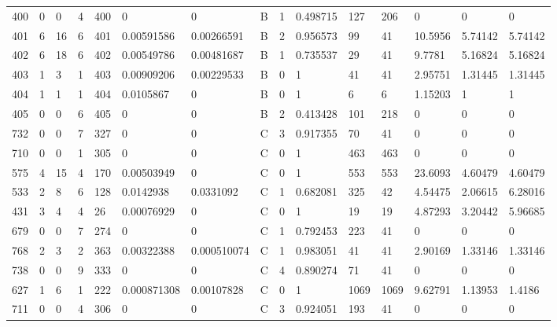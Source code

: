 \begin{latin}
\begin{longtable}{lllllllllllllll}
	400 & 0  & 0   & 4  & 400 & 0              & 0              & B & 1  & 0.498715 & 127  & 206  & 0       & 0       & 0       \\
	401 & 6  & 16  & 6  & 401 & 0.00591586     & 0.00266591     & B & 2  & 0.956573 & 99   & 41   & 10.5956 & 5.74142 & 5.74142 \\
	402 & 6  & 18  & 6  & 402 & 0.00549786     & 0.00481687     & B & 1  & 0.735537 & 29   & 41   & 9.7781  & 5.16824 & 5.16824 \\
	403 & 1  & 3   & 1  & 403 & 0.00909206     & 0.00229533     & B & 0  & 1        & 41   & 41   & 2.95751 & 1.31445 & 1.31445 \\
	404 & 1  & 1   & 1  & 404 & 0.0105867      & 0              & B & 0  & 1        & 6    & 6    & 1.15203 & 1       & 1       \\
	405 & 0  & 0   & 6  & 405 & 0              & 0              & B & 2  & 0.413428 & 101  & 218  & 0       & 0       & 0       \\
	732 & 0  & 0   & 7  & 327 & 0              & 0              & C & 3  & 0.917355 & 70   & 41   & 0       & 0       & 0       \\
	710 & 0  & 0   & 1  & 305 & 0              & 0              & C & 0  & 1        & 463  & 463  & 0       & 0       & 0       \\
	575 & 4  & 15  & 4  & 170 & 0.00503949     & 0              & C & 0  & 1        & 553  & 553  & 23.6093 & 4.60479 & 4.60479 \\
	533 & 2  & 8   & 6  & 128 & 0.0142938      & 0.0331092      & C & 1  & 0.682081 & 325  & 42   & 4.54475 & 2.06615 & 6.28016 \\
	431 & 3  & 4   & 4  & 26  & 0.00076929     & 0              & C & 0  & 1        & 19   & 19   & 4.87293 & 3.20442 & 5.96685 \\
	679 & 0  & 0   & 7  & 274 & 0              & 0              & C & 1  & 0.792453 & 223  & 41   & 0       & 0       & 0       \\
	768 & 2  & 3   & 2  & 363 & 0.00322388     & 0.000510074    & C & 1  & 0.983051 & 41   & 41   & 2.90169 & 1.33146 & 1.33146 \\
	738 & 0  & 0   & 9  & 333 & 0              & 0              & C & 4  & 0.890274 & 71   & 41   & 0       & 0       & 0       \\
	627 & 1  & 6   & 1  & 222 & 0.000871308    & 0.00107828     & C & 0  & 1        & 1069 & 1069 & 9.62791 & 1.13953 & 1.4186  \\
	711 & 0  & 0   & 4  & 306 & 0              & 0              & C & 3  & 0.924051 & 193  & 41   & 0       & 0       & 0       \\

\end{longtable}
\end{latin}
